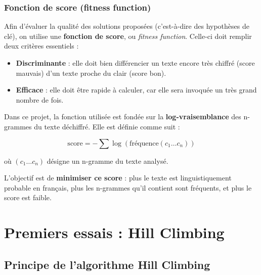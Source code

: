\documentclass[a4paper]{article}
\begin{document}
\subsubsection{Fonction de score (fitness function)}

Afin d’évaluer la qualité des solutions proposées (c’est-à-dire des hypothèses de clé), on utilise une \textbf{fonction de score}, ou \textit{fitness function}. Celle-ci doit remplir deux critères essentiels :

\begin{itemize}
    \item \textbf{Discriminante} : elle doit bien différencier un texte encore très chiffré (score mauvais) d’un texte proche du clair (score bon).
    \item \textbf{Efficace} : elle doit être rapide à calculer, car elle sera invoquée un très grand nombre de fois.
\end{itemize}

Dans ce projet, la fonction utilisée est fondée sur la \textbf{log-vraisemblance} des n-grammes du texte déchiffré. Elle est définie comme suit :

\[
\text{score} = - \sum \log\left(\text{fréquence}(c_1 \ldots c_n)\right)
\]

où $(c_1 \ldots c_n)$ désigne un n-gramme du texte analysé.

L’objectif est de \textbf{minimiser ce score} : plus le texte est linguistiquement probable en français, plus les n-grammes qu’il contient sont fréquents, et plus le score est faible.


\section{Premiers essais : Hill Climbing}

\subsection{Principe de l’algorithme Hill Climbing}
\end{document}
